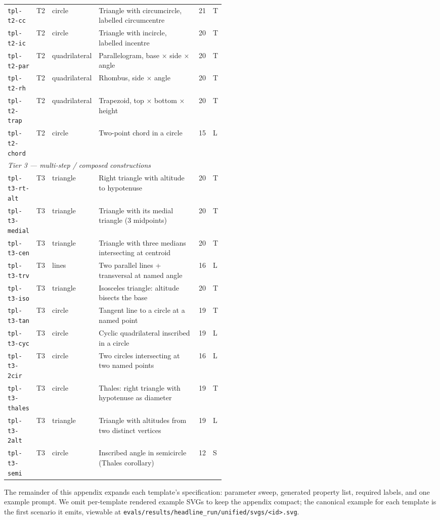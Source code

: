 \begin{table}[t]
\begin{tabular}{@{}lllp{0.50\linewidth}rl@{}}
\texttt{tpl-t2-cc} & T2 & circle & Triangle with circumcircle, labelled circumcentre & 21 & T \\
\texttt{tpl-t2-ic} & T2 & circle & Triangle with incircle, labelled incentre & 20 & T \\
\texttt{tpl-t2-par} & T2 & quadrilateral & Parallelogram, base $\times$ side $\times$ angle & 20 & T \\
\texttt{tpl-t2-rh} & T2 & quadrilateral & Rhombus, side $\times$ angle & 20 & T \\
\texttt{tpl-t2-trap} & T2 & quadrilateral & Trapezoid, top $\times$ bottom $\times$ height & 20 & T \\
\texttt{tpl-t2-chord} & T2 & circle & Two-point chord in a circle & 15 & L \\
\midrule
\multicolumn{6}{l}{\textit{Tier 3 --- multi-step / composed constructions}} \\
\texttt{tpl-t3-rt-alt} & T3 & triangle & Right triangle with altitude to hypotenuse & 20 & T \\
\texttt{tpl-t3-medial} & T3 & triangle & Triangle with its medial triangle (3 midpoints) & 20 & T \\
\texttt{tpl-t3-cen} & T3 & triangle & Triangle with three medians intersecting at centroid & 20 & T \\
\texttt{tpl-t3-trv} & T3 & lines & Two parallel lines + transversal at named angle & 16 & L \\
\texttt{tpl-t3-iso} & T3 & triangle & Isosceles triangle: altitude bisects the base & 20 & T \\
\texttt{tpl-t3-tan} & T3 & circle & Tangent line to a circle at a named point & 19 & T \\
\texttt{tpl-t3-cyc} & T3 & circle & Cyclic quadrilateral inscribed in a circle & 19 & L \\
\texttt{tpl-t3-2cir} & T3 & circle & Two circles intersecting at two named points & 16 & L \\
\texttt{tpl-t3-thales} & T3 & circle & Thales: right triangle with hypotenuse as diameter & 19 & T \\
\texttt{tpl-t3-2alt} & T3 & triangle & Triangle with altitudes from two distinct vertices & 19 & L \\
\texttt{tpl-t3-semi} & T3 & circle & Inscribed angle in semicircle (Thales corollary) & 12 & S \\
\bottomrule
\end{tabular}
\end{table}

The remainder of this appendix expands each template's specification: parameter sweep, generated property list, required labels, and one example prompt.
We omit per-template rendered example SVGs to keep the appendix compact; the canonical example for each template is the first scenario it emits, viewable at \texttt{evals/results/headline\_run/unified/svgs/<id>.svg}.

